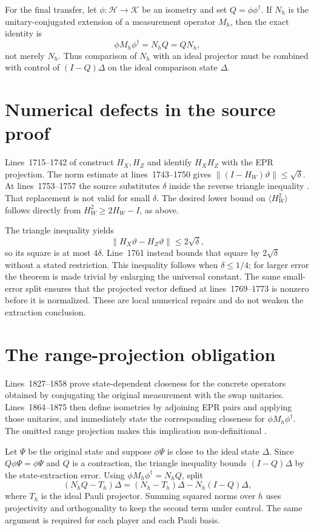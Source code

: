 \documentclass[11pt]{article}
\begin{document}
For the final transfer, let $\phi\colon\mathcal H\to\mathcal K$ be an isometry
and set $Q=\phi\phi^\dagger$.  If $N_h$ is the unitary-conjugated extension of
a measurement operator $M_h$, then the exact identity is
\[
  \phi M_h\phi^\dagger=N_hQ=QN_h,
\]
not merely $N_h$.  Thus comparison of $N_h$ with an ideal projector must be
combined with control of $(I-Q)\Delta$ on the ideal comparison state
$\Delta$.

\section{Numerical defects in the source proof}

Lines~1715--1742 of
construct $H_X,H_Z$ and identify $H_XH_Z$ with the EPR projection.  The norm
estimate at lines~1743--1750 gives
$\lVert(I-H_W)\vartheta\rVert\leq\sqrt\delta$.  At lines~1753--1757 the
source substitutes $\delta$ inside the reverse triangle inequality
\cite[lines~1715--1783]{Ji2020MIPStar}.  That replacement is not valid for
small $\delta$.  The desired lower bound on
$\langle H_W^2\rangle$ follows directly from $H_W^2\geq2H_W-I$, as above.

The triangle inequality yields
\[
  \lVert H_X\vartheta-H_Z\vartheta\rVert\leq2\sqrt\delta,
\]
so its square is at most $4\delta$.  Line~1761 instead bounds that square by
$2\sqrt\delta$ without a stated restriction.  This inequality follows when
$\delta\leq1/4$; for larger error the theorem is made trivial by enlarging the
universal constant.  The same small-error split ensures that the projected
vector defined at lines~1769--1773 is nonzero before it is normalized.  These
are local numerical repairs and do not weaken the extraction conclusion.

\section{The range-projection obligation}

Lines~1827--1858 prove state-dependent closeness for the concrete operators
obtained by conjugating the original measurement with the swap unitaries.
Lines~1864--1875 then define isometries by adjoining EPR pairs and applying
those unitaries, and immediately state the corresponding closeness for
$\phi M_h\phi^\dagger$.  The omitted range projection makes this implication
non-definitional \cite[lines~1827--1875]{Ji2020MIPStar}.

Let $\Psi$ be the original state and suppose $\phi\Psi$ is close to the ideal
state $\Delta$.  Since $Q\phi\Psi=\phi\Psi$ and $Q$ is a contraction, the
triangle inequality bounds $(I-Q)\Delta$ by the state-extraction error.  Using
$\phi M_h\phi^\dagger=N_hQ$, split
\[
  (N_hQ-T_h)\Delta
  =(N_h-T_h)\Delta-N_h(I-Q)\Delta,
\]
where $T_h$ is the ideal Pauli projector.  Summing squared norms over $h$
uses projectivity and orthogonality to keep the second term under control.
The same argument is required for each player and each Pauli basis.
\end{document}
